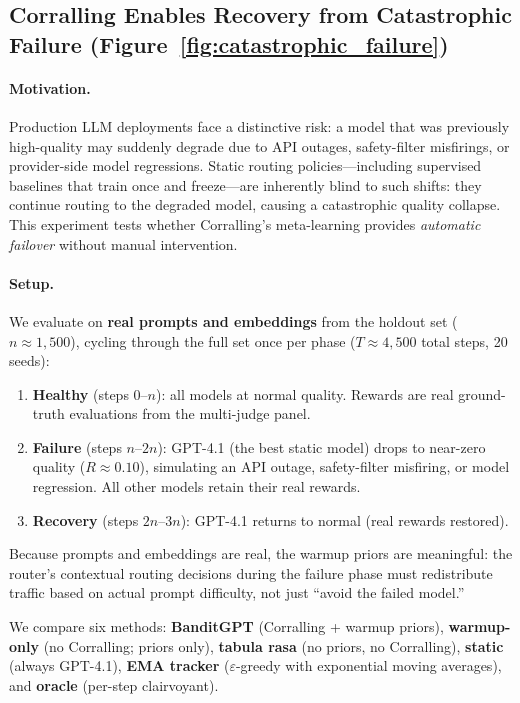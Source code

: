 \subsection{Corralling Enables Recovery from Catastrophic Failure
(Figure~\ref{fig:catastrophic_failure})}
\label{sec:catastrophic_failure}

\paragraph{Motivation.}
Production LLM deployments face a distinctive risk: a model that was
previously high-quality may suddenly degrade due to API outages,
safety-filter misfirings, or provider-side model regressions.
Static routing policies---including supervised baselines that train once
and freeze---are inherently blind to such shifts: they continue routing
to the degraded model, causing a catastrophic quality collapse.
This experiment tests whether Corralling's meta-learning provides
\emph{automatic failover} without manual intervention.

\paragraph{Setup.}
We evaluate on \textbf{real prompts and embeddings} from the holdout
set ($n \approx 1{,}500$), cycling through the full set once per phase
($T \approx 4{,}500$ total steps, 20 seeds):
\begin{enumerate}[leftmargin=*]
    \item \textbf{Healthy} (steps $0$--$n$): all models at normal
          quality.  Rewards are real ground-truth evaluations from the
          multi-judge panel.
    \item \textbf{Failure} (steps $n$--$2n$): GPT-4.1 (the best static
          model) drops to near-zero quality ($R \approx 0.10$),
          simulating an API outage, safety-filter misfiring, or model
          regression.  All other models retain their real rewards.
    \item \textbf{Recovery} (steps $2n$--$3n$): GPT-4.1 returns to
          normal (real rewards restored).
\end{enumerate}
Because prompts and embeddings are real, the warmup priors are meaningful:
the router's contextual routing decisions during the failure phase must
redistribute traffic based on actual prompt difficulty, not just ``avoid
the failed model.''

We compare six methods:
\textbf{BanditGPT} (Corralling + warmup priors),
\textbf{warmup-only} (no Corralling; priors only),
\textbf{tabula rasa} (no priors, no Corralling),
\textbf{static} (always GPT-4.1),
\textbf{EMA tracker} ($\varepsilon$-greedy with exponential moving averages),
and \textbf{oracle} (per-step clairvoyant).

